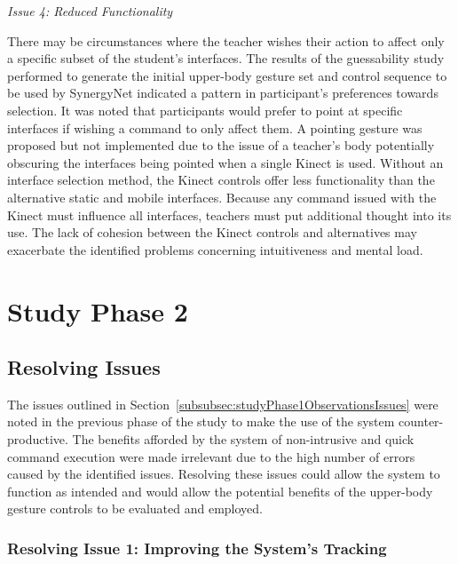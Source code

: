 \documentclass[link]{IWCOMP}
\begin{document}
\emph{Issue 4: Reduced Functionality}

There may be circumstances where the teacher wishes their action to affect only a specific subset of the student's interfaces.
The results of the guessability study performed to generate the initial upper-body gesture set and control sequence to be used by SynergyNet indicated a pattern in participant's preferences towards selection.
It was noted that participants would prefer to point at specific interfaces if wishing a command to only affect them.
A pointing gesture was proposed but not implemented due to the issue of a teacher's body potentially obscuring the interfaces being pointed when a single Kinect is used.
Without an interface selection method, the Kinect controls offer less functionality than the alternative static and mobile interfaces.
Because any command issued with the Kinect must influence all interfaces, teachers must put additional thought into its use.
The lack of cohesion between the Kinect controls and alternatives may exacerbate the identified problems concerning intuitiveness and mental load.

\section{Study Phase 2}
\label{sec:studyPhase2}


\subsection{Resolving Issues}
\label{subsec:studyPhase2ResolvingIssues}


The issues outlined in Section~\ref{subsubsec:studyPhase1ObservationsIssues} were noted in the previous phase of the study to make the use of the system counter-productive.
The benefits afforded by the system of non-intrusive and quick command execution were made irrelevant due to the high number of errors caused by the identified issues.
Resolving these issues could allow the system to function as intended and would allow the potential benefits of the upper-body gesture controls to be evaluated and employed.

\subsubsection{Resolving Issue 1: Improving the System's Tracking}
\label{subsubsec:studyPhase2ResolvingIssues1}
\end{document}

